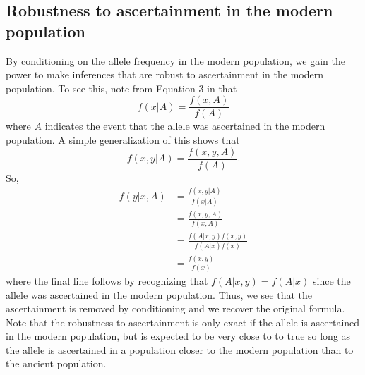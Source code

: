 \documentclass[11pt, oneside]{article}   	%
\begin{document}
\subsection{Robustness to ascertainment in the modern population}
By conditioning on the allele frequency in the modern population, we gain the power to make inferences that are robust to ascertainment in the modern population. To see this, note from Equation 3 in \citet{nielsen2003correcting} that 
\[
f(x | A) = \frac{f(x, A)}{f(A)}
\]
where $A$ indicates the event that the allele was ascertained in the modern population. A simple generalization of this shows that
\[
f(x,y|A) = \frac{f(x,y,A)}{f(A)}.
\]
So,
\begin{align*}
f(y | x, A) &= \frac{f(x, y | A)}{f(x | A)} \\
&= \frac{f(x,y,A)}{f(x,A)} \\
&= \frac{f(A | x, y)f(x,y)}{f(A | x)f(x)} \\
&= \frac{f(x,y)}{f(x)}
\end{align*}
where the final line follows by recognizing that $f(A | x, y) = f(A | x)$ since the allele was ascertained in the modern population. Thus, we see that the ascertainment is removed by conditioning and we recover the original formula. Note that the robustness to ascertainment is only exact if the allele is ascertained in the modern population, but is expected to be very close to to true so long as the allele is ascertained in a population closer to the modern population than to the ancient population.
\end{document}
